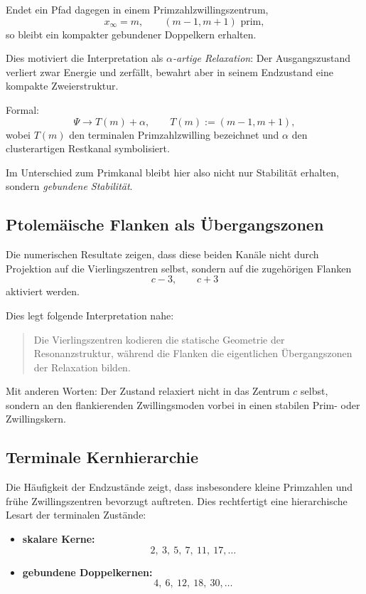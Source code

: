 \documentclass[11pt,a4paper]{article}
\theoremstyle{definition}
\theoremstyle{plain}
\theoremstyle{remark}
\begin{document}
	Endet ein Pfad dagegen in einem Primzahlzwillingszentrum,
	\[
	x_\infty = m,
	\qquad (m-1,m+1)\text{ prim},
	\]
	so bleibt ein kompakter gebundener Doppelkern erhalten.
	
	Dies motiviert die Interpretation als \emph{\(\alpha\)-artige Relaxation}: 
	Der Ausgangszustand verliert zwar Energie und zerfällt, bewahrt aber in seinem Endzustand eine kompakte Zweierstruktur.
	
	Formal:
	\[
	\Psi \longrightarrow T(m) + \alpha,
	\qquad T(m):=(m-1,m+1),
	\]
	wobei \(T(m)\) den terminalen Primzahlzwilling bezeichnet und \(\alpha\) den clusterartigen Restkanal symbolisiert.
	
	Im Unterschied zum Primkanal bleibt hier also nicht nur Stabilität erhalten, sondern \emph{gebundene Stabilität}.
	
	\subsection{Ptolemäische Flanken als Übergangszonen}
	
	Die numerischen Resultate zeigen, dass diese beiden Kanäle nicht durch Projektion auf die Vierlingszentren selbst, sondern auf die zugehörigen Flanken
	\[
	c-3,\qquad c+3
	\]
	aktiviert werden.
	
	Dies legt folgende Interpretation nahe:
	
	\begin{quote}
		Die Vierlingszentren kodieren die statische Geometrie der Resonanzstruktur, während die Flanken die eigentlichen Übergangszonen der Relaxation bilden.
	\end{quote}
	
	Mit anderen Worten:
	Der Zustand relaxiert nicht in das Zentrum \(c\) selbst, sondern an den flankierenden Zwillingsmoden vorbei in einen stabilen Prim- oder Zwillingskern.
	
	\subsection{Terminale Kernhierarchie}
	
	Die Häufigkeit der Endzustände zeigt, dass insbesondere kleine Primzahlen und frühe Zwillingszentren bevorzugt auftreten. 
	Dies rechtfertigt eine hierarchische Lesart der terminalen Zustände:
	
	\begin{itemize}
		\item \textbf{skalare Kerne:}
		\[
		2,\ 3,\ 5,\ 7,\ 11,\ 17,\dots
		\]
		\item \textbf{gebundene Doppelkernen:}
		\[
		4,\ 6,\ 12,\ 18,\ 30,\dots
		\]
	\end{itemize}
	
\end{document}
